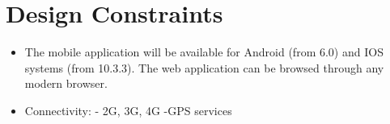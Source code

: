\section{Design Constraints}
\begin{itemize}
\item The mobile application will be available for Android (from 6.0) and IOS systems (from 10.3.3).
The web application can be browsed through any modern browser. 
\item 
Connectivity:\newline
- 2G, 3G, 4G \newline
-GPS services
\end{itemize}
